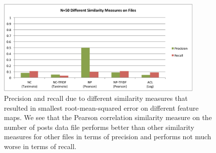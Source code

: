 \documentclass{article}
\begin{document}
\begin{figure}[H]
\centering
\includegraphics[width=0.9\textwidth]{img/sim-on-files.pdf}
\caption{Precision and recall due to different similarity measures that resulted in smallest
root-mean-squared error on different feature maps. We see that the Pearson correlation
similarity measure on the number of posts data file performs better
than other similarity measures for other files in terms of precision and performs
not much worse in terms of recall.}\label{fig:feature-map}
\end{figure} 
\end{document}
